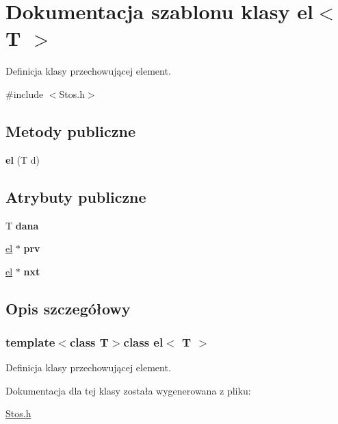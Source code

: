 \hypertarget{classel}{\section{\-Dokumentacja szablonu klasy el$<$ \-T $>$}
\label{classel}
}


\-Definicja klasy przechowującej element.  




{\ttfamily \#include $<$\-Stos.\-h$>$}

\subsection*{\-Metody publiczne}
\begin{DoxyCompactItemize}
\item 
\hypertarget{classel_aa3e5b1b1e8674023f92ad9694c41ae2b}{{\bfseries el} (\-T d)}\label{classel_aa3e5b1b1e8674023f92ad9694c41ae2b}

\end{DoxyCompactItemize}
\subsection*{\-Atrybuty publiczne}
\begin{DoxyCompactItemize}
\item 
\hypertarget{classel_aced2827a8e030b5b9d5f857b8f202582}{\-T {\bfseries dana}}\label{classel_aced2827a8e030b5b9d5f857b8f202582}

\item 
\hypertarget{classel_a69d8939dbcd5c7fbb8467263f7000696}{\hyperlink{classel}{el} $\ast$ {\bfseries prv}}\label{classel_a69d8939dbcd5c7fbb8467263f7000696}

\item 
\hypertarget{classel_aa1eac5dfc1ae72aa97ac92db49b4bc05}{\hyperlink{classel}{el} $\ast$ {\bfseries nxt}}\label{classel_aa1eac5dfc1ae72aa97ac92db49b4bc05}

\end{DoxyCompactItemize}


\subsection{\-Opis szczegółowy}
\subsubsection*{template$<$class \-T$>$class el$<$ T $>$}

\-Definicja klasy przechowującej element. 

\-Dokumentacja dla tej klasy została wygenerowana z pliku\-:\begin{DoxyCompactItemize}
\item 
\hyperlink{_stos_8h}{\-Stos.\-h}\end{DoxyCompactItemize}
